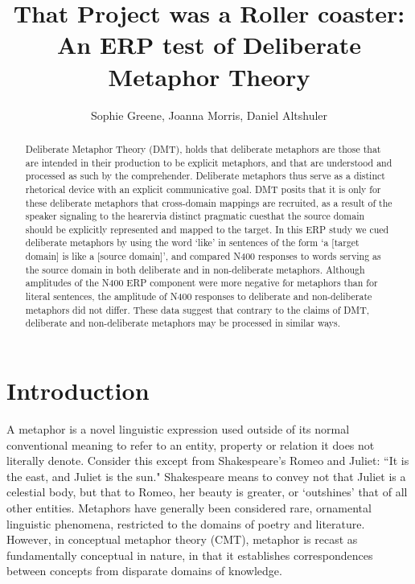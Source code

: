\documentclass[]{article}
\title{That Project was a Roller coaster: An ERP test of Deliberate Metaphor Theory}
\author{Sophie Greene, Joanna Morris, Daniel Altshuler}
\begin{document}
	

\maketitle

\begin{abstract}

	Deliberate Metaphor Theory (DMT), holds that deliberate metaphors are those that are intended in their production to be explicit metaphors, and that are understood and processed as such by the comprehender. Deliberate metaphors thus serve as a distinct rhetorical device with an explicit communicative goal. DMT posits that it is only for these deliberate metaphors that cross-domain mappings are recruited, as a result of the speaker signaling to the hearer\textemdash via distinct pragmatic cues\textemdash that the source domain should be explicitly represented and mapped to the target. In this ERP study we cued deliberate metaphors by using the word ‘like’ in sentences of the form ‘a [target domain] is like a [source domain]’, and compared N400 responses to words serving as the source domain in both deliberate and in non-deliberate metaphors. Although amplitudes of the N400 ERP component were more negative for metaphors than for literal sentences, the amplitude of N400 responses to deliberate and non-deliberate metaphors did not differ. These data suggest that contrary to the claims of DMT, deliberate and non-deliberate metaphors may be processed in similar ways.

\end{abstract}

\section{Introduction}

	
    A metaphor is a novel linguistic expression used outside of its normal conventional meaning to refer to an entity, property or relation it does not literally denote. Consider this except from Shakespeare's Romeo and Juliet: ``It is the east, and Juliet is the sun."  Shakespeare means to convey not that Juliet is a celestial body, but that to Romeo, her beauty is greater, or `outshines' that of all other entities.  
	Metaphors have generally been considered rare, ornamental linguistic phenomena, restricted to the domains of poetry and literature.  However, in conceptual metaphor theory (CMT), metaphor is recast as fundamentally conceptual in nature, in that it establishes correspondences between concepts from disparate domains of knowledge\parencite{lakoff_conceptual_1980}.  
	
\end{document}
